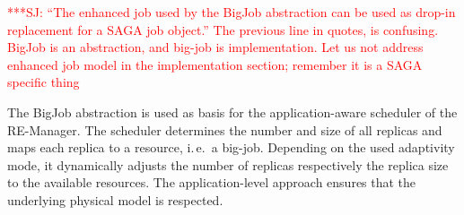 \documentclass{rspublic}
\newcommand{\alnote}[1]{ {\textcolor{blue} { ***AL: #1 }}}
\newcommand{\jhanote}[1]{ {\textcolor{red} { ***SJ: #1 }}}
\newcommand{\alnote}[1]{}
\newcommand{\jhanote}[1]{}
\newcommand{\glidein}[1]{Glide-In }
\newcommand{\remanager}[1]{RE-Manager }
\begin{document}
\jhanote{``The enhanced job
  used by the BigJob abstraction can be used as drop-in replacement
  for a SAGA job object.'' The previous line in quotes, is
  confusing. BigJob is an abstraction, and big-job is
  implementation. Let us not address enhanced job model in the
  implementation section; remember it is a SAGA specific thing}


The BigJob abstraction is used as basis for the application-aware scheduler
of the RE-Manager. The scheduler determines the number and size of all replicas and
maps each replica to a resource, i.\,e.\ a big-job. Depending on the used adaptivity mode,
it dynamically adjusts the number of replicas respectively the replica 
size to the available resources. The application-level approach ensures 
that the underlying physical model is respected.



                                         


\end{document}
